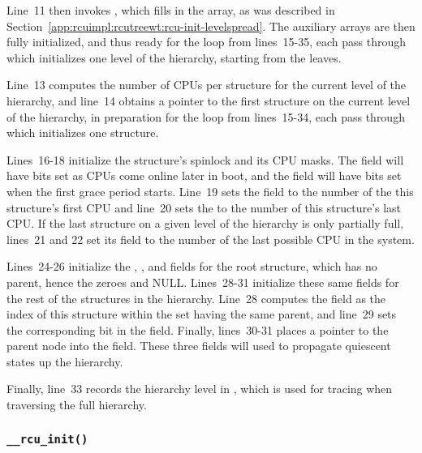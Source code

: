 Line~11 then invokes , which fills in the
 array, as was described in
Section~\ref{app:rcuimpl:rcutreewt:rcu-init-levelspread}.
The auxiliary arrays are then fully initialized, and thus ready for
the loop from lines~15-35, each pass through which initializes
one level of the  hierarchy, starting from the leaves.

Line~13 computes the number of CPUs per  structure for
the current level of the hierarchy, and line~14 obtains a pointer
to the first  structure on the current level of the
hierarchy, in preparation for the loop from lines~15-34, each pass
through which initializes one  structure.

Lines~16-18 initialize the  structure's spinlock and
its CPU masks.
The  field will have bits set as CPUs come online
later in boot, and the  field will have bits set
when the first grace period starts.
Line~19 sets the  field to the number of the this
 structure's first CPU and line~20 sets the
 to the number of this  structure's
last CPU.
If the last  structure on a given level of the
hierarchy is only partially full, lines~21 and 22 set its
 field to the number of the last possible CPU in the system.

Lines~24-26 initialize the , , and
 fields for the root  structure, which
has no parent, hence the zeroes and NULL.
Lines~28-31 initialize these same fields for the rest of the
 structures in the hierarchy.
Line~28 computes the  field as the index of this
 structure within
the set having the same parent, and
line~29 sets the corresponding bit in the  field.
Finally, lines~30-31 places a pointer to the parent node into the
 field.
These three fields will used to propagate quiescent states up the
hierarchy.

Finally, line~33 records the hierarchy level in ,
which is used for tracing when traversing the full hierarchy.

\subsubsection{\tt \_\_rcu\_init()}
\label{app:rcuimpl:rcutreewt:rcu-init}

